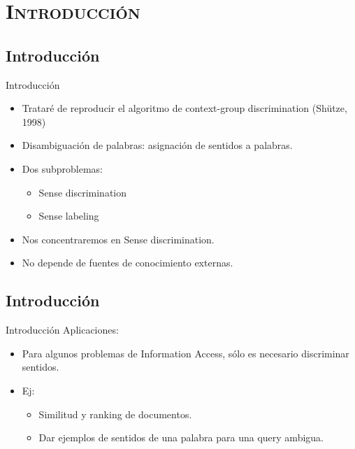 \documentclass[xcolor=x11names,compress]{beamer}
\renewcommand{\(}{\begin{columns}}
\renewcommand{\)}{\end{columns}}
\newcommand{\<}[1]{\begin{column}{#1}}
\renewcommand{\>}{\end{column}}
\begin{document}
\section{\scshape Introducción}
\subsection{Introducción}
\begin{frame}{Introducción}
\begin{itemize}
\item Trataré de reproducir el algoritmo de context-group discrimination (Shütze, 1998)
\item Disambiguación de palabras: asignación de sentidos a palabras.
\item Dos subproblemas:
\begin{itemize}
\item Sense discrimination
\item Sense labeling
\end{itemize}
\item Nos concentraremos en Sense discrimination.
\item No depende de fuentes de conocimiento externas.
\end{itemize}
\end{frame}
\subsection{Introducción}
\begin{frame}{Introducción}
Aplicaciones:
\begin{itemize}
\item Para algunos problemas de Information Access, sólo es necesario discriminar sentidos.
\item Ej:
\begin{itemize}
\item Similitud y ranking de documentos.
\item Dar ejemplos de sentidos de una palabra para una query ambigua.
\end{itemize}
\end{itemize}
\end{frame}
\end{document}
